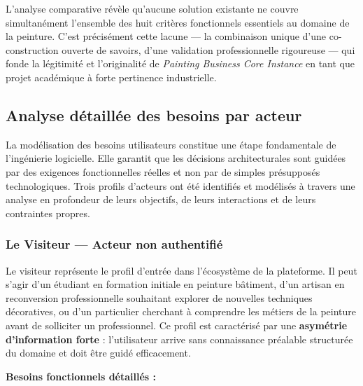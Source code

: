 \documentclass[12pt,a4paper]{report}
\begin{document}
\begin{warnbox}
L'analyse comparative révèle qu'aucune solution existante ne couvre simultanément l'ensemble des huit critères fonctionnels essentiels au domaine de la peinture. C'est précisément cette lacune — la combinaison unique d'une co-construction ouverte de savoirs, d'une validation professionnelle rigoureuse — qui fonde la légitimité et l'originalité de \textit{Painting Business Core Instance} en tant que projet académique à forte pertinence industrielle.
\end{warnbox}

\subsection{Analyse détaillée des besoins par acteur}

\noindent
La modélisation des besoins utilisateurs constitue une étape fondamentale de l'ingénierie logicielle. Elle garantit que les décisions architecturales sont guidées par des exigences fonctionnelles réelles et non par de simples présupposés technologiques. Trois profils d'acteurs ont été identifiés et modélisés à travers une analyse en profondeur de leurs objectifs, de leurs interactions et de leurs contraintes propres.

\subsubsection*{Le Visiteur — Acteur non authentifié}

\noindent
Le visiteur représente le profil d'entrée dans l'écosystème de la plateforme. Il peut s'agir d'un étudiant en formation initiale en peinture bâtiment, d'un artisan en reconversion professionnelle souhaitant explorer de nouvelles techniques décoratives, ou d'un particulier cherchant à comprendre les métiers de la peinture avant de solliciter un professionnel. Ce profil est caractérisé par une \textbf{asymétrie d'information forte} : l'utilisateur arrive sans connaissance préalable structurée du domaine et doit être guidé efficacement.

\vspace{0.5em}
\textbf{Besoins fonctionnels détaillés :}
\end{document}
